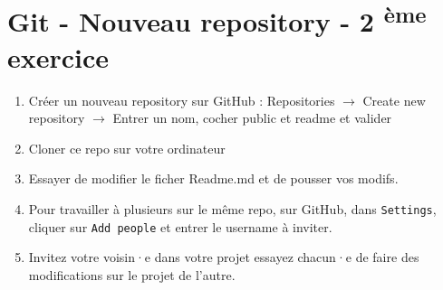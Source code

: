 \documentclass[11pt, a4paper]{book}
\begin{document}
\section{Git - Nouveau repository - 2 \textsuperscript{ème} exercice}
\begin{enumerate}
    \item Créer un nouveau repository sur GitHub :  Repositories $\rightarrow$ Create new repository $\rightarrow$ Entrer un nom, cocher public et readme et valider
    \item Cloner ce repo sur votre ordinateur
    \item Essayer de modifier le ficher Readme.md et de pousser vos modifs.
    \item Pour travailler à plusieurs sur le même repo,  sur GitHub, dans \texttt{Settings}, cliquer sur \texttt{Add people} et entrer le username à inviter.
    \item Invitez votre voisin·e dans votre projet essayez chacun·e de faire des modifications sur le projet de l'autre.
\end{enumerate}
\end{document}
